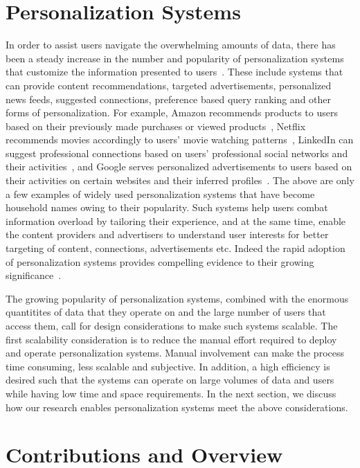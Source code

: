 \documentclass[12pt]{ucsddissertation}
\begin{document}
\section{Personalization Systems}
In order to assist users navigate the overwhelming amounts of data, there has been a steady increase in the number and popularity of personalization systems that customize the information presented to users~\cite{eirinaki2003web}. These include systems that can provide content recommendations, targeted advertisements, personalized news feeds, suggested connections, preference based query ranking and other forms of personalization. For example, Amazon recommends products to users based on their previously made purchases or viewed products~\cite{Amazon}, Netflix recommends movies accordingly to users' movie watching patterns~\cite{Netflix}, LinkedIn can suggest professional connections based on users' professional social networks and their activities~\cite{LinkedIn}, and Google serves personalized advertisements to users based on their activities on certain websites and their inferred profiles~\cite{Google,castelluccia2012betrayed,GoogleAdsense}. The above are only a few examples of widely used personalization systems that have become household names owing to their popularity. Such systems help users combat information overload by tailoring their experience, and at the same time, enable the content providers and advertisers to understand user interests for better targeting of content, connections, advertisements etc. Indeed the rapid adoption of personalization systems provides compelling evidence to their growing significance~\cite{castellano2009innovations}. 


The growing popularity of personalization systems, combined with the enormous quantitites of data that they operate on and the large number of users that access them, call for design considerations to make such systems scalable. The first scalability consideration is to reduce the manual effort required to deploy and operate personalization systems. Manual involvement can make the process time consuming, less scalable and subjective. In addition, a high efficiency is desired such that the systems can operate on large volumes of data and users while having low time and space requirements. In the next section, we discuss how our research enables personalization systems meet the above considerations. 

\section{Contributions and Overview}
\end{document}
